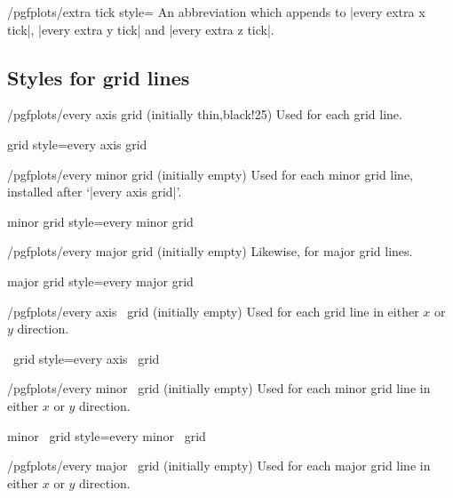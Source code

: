 \begin{stylekey}{/pgfplots/extra tick style=}
	An abbreviation which appends  to |every extra x tick|, |every extra y tick| and |every extra z tick|.
\end{stylekey}



\subsection*{Styles for grid lines}

\begin{stylekey}{/pgfplots/every axis grid (initially thin,black!25)}
 Used for each grid line.
\end{stylekey}

\pgfplotsshortstylekey grid style=every axis grid\pgfeov

\begin{stylekey}{/pgfplots/every minor grid (initially empty)}
 Used for each minor grid line, installed after `|every axis grid|'.
\end{stylekey}

\pgfplotsshortstylekey minor grid style=every minor grid\pgfeov

\begin{stylekey}{/pgfplots/every major grid (initially empty)}
 Likewise, for major grid lines.
\end{stylekey}

\pgfplotsshortstylekey major grid style=every major grid\pgfeov

\begin{xystylekey}{/pgfplots/every axis \x\ grid (initially empty)}
	Used for each grid line in either $x$ or $y$ direction.
\end{xystylekey}

\pgfplotsshortxystylekey \x\ grid style=every axis \x\ grid\pgfeov

\begin{xystylekey}{/pgfplots/every minor \x\ grid (initially empty)}
	Used for each minor grid line in either $x$ or $y$ direction.
\end{xystylekey}

\pgfplotsshortxystylekey minor \x\ grid style=every minor \x\ grid\pgfeov

\begin{xystylekey}{/pgfplots/every major \x\ grid (initially empty)}
	Used for each major grid line in either $x$ or $y$ direction.
\end{xystylekey}

